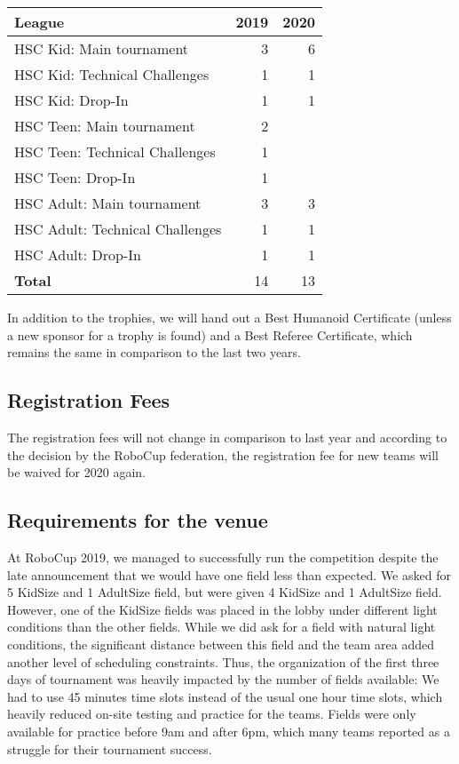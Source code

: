 \documentclass{article}
\begin{document}
\begin{table}[h]
  \centering
  \begin{tabular}{l | r | r}
    League & 2019 & 2020\\
    \hline
    HSC Kid: Main tournament & 3 & 6\\ 
    HSC Kid: Technical Challenges & 1 & 1\\
    HSC Kid: Drop-In & 1 & 1\\
    HSC Teen: Main tournament & 2 & \\ 
    HSC Teen: Technical Challenges & 1 & \\
    HSC Teen: Drop-In & 1 & \\
    HSC Adult: Main tournament & 3 & 3\\ 
    HSC Adult: Technical Challenges & 1 & 1\\
    HSC Adult: Drop-In & 1 & 1\\
    \hline
    \textbf{Total} & 14 & 13
  \end{tabular}
\end{table}

In addition to the trophies, we will hand out a Best Humanoid Certificate (unless a new sponsor for a trophy is found) and a Best Referee Certificate, which remains the same in comparison to the last two years.

\subsection{Registration Fees}
The registration fees will not change in comparison to last year and according to the decision by the RoboCup federation, the registration fee for new teams will be waived for 2020 again. 

\subsection{Requirements for the venue}

At RoboCup 2019, we managed to successfully run the competition despite the late
announcement that we would have one field less than expected. We asked for 5 KidSize and 1 AdultSize field, but were given 4 KidSize and 1 AdultSize field. However, one of the KidSize fields was placed in the lobby under different light conditions than the other fields. While we did ask for a field with natural light conditions, the significant distance between this field and the team area added another level of scheduling constraints. Thus, the organization of the first three days of tournament was heavily impacted by the number of fields available: We had to use 45 minutes time slots instead of the usual one hour time slots, which heavily reduced on-site testing and practice for the teams. Fields were only available for practice before 9am and after 6pm, which many teams reported as a struggle for their tournament success. 
\end{document}
